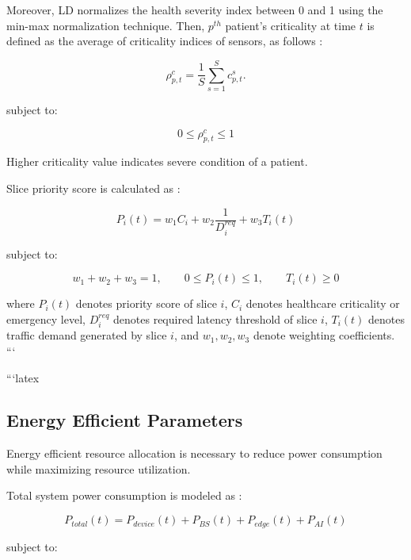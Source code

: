 \documentclass[10pt,journal,compsoc]{IEEEtran}
\begin{document}
Moreover, LD normalizes the health severity index between 0 and 1 using the min-max normalization technique.
Then, $p^{th}$ patient's criticality at time $t$ is defined as the average of criticality indices of sensors, as follows \cite{basu2022softhealth}:

\begin{equation}\label{PatientCriticality}
   \rho^{c}_{p,t} = \frac{1}{S} \sum_{s=1}^{S}c_{p,t}^s.
\end{equation}

subject to:

\begin{equation}
0\leq \rho^{c}_{p,t}\leq1
\end{equation}

Higher criticality value indicates severe condition of a patient. 

Slice priority score is calculated as \cite{yaqoob2026aqps,sarker2026prioritybw}:

\begin{equation}
P_i(t)=w_1C_i+w_2\frac{1}{D_i^{req}}+w_3T_i(t)
\end{equation}

subject to:

\begin{equation}
w_1+w_2+w_3=1,\qquad 0\leq P_i(t)\leq1,\qquad T_i(t)\geq0
\end{equation}

where $P_i(t)$ denotes priority score of slice $i$, $C_i$ denotes healthcare criticality or emergency level, $D_i^{req}$ denotes required latency threshold of slice $i$, $T_i(t)$ denotes traffic demand generated by slice $i$, and $w_1,w_2,w_3$ denote weighting coefficients.
```


```latex
\subsection{Energy Efficient Parameters}

Energy efficient resource allocation is necessary to reduce power consumption while maximizing resource utilization.

Total system power consumption is modeled as \cite{shah2025oran,ruan2026trafficclass,donatti2025energy}:

\begin{equation}
P_{total}(t)=P_{device}(t)+P_{BS}(t)+P_{edge}(t)+P_{AI}(t)
\end{equation}

subject to:
\end{document}
